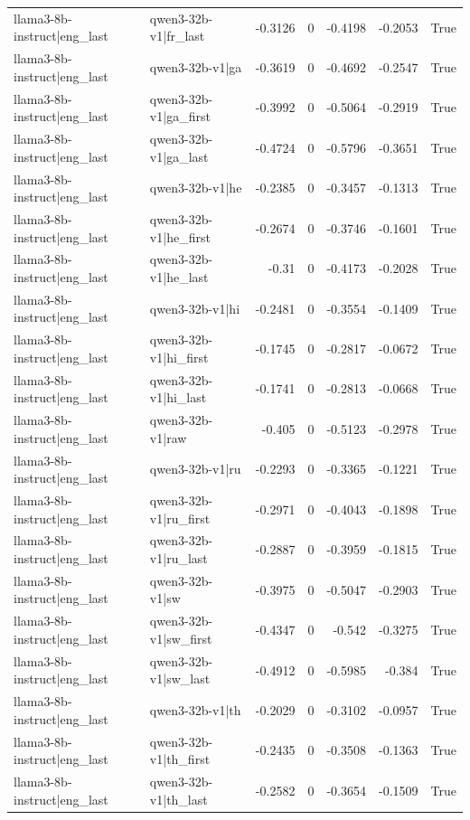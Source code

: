 \begin{table}
\begin{tabular}{l l r r r r l}
llama3-8b-instruct|eng_last & qwen3-32b-v1|fr_last & -0.3126 & 0 & -0.4198 & -0.2053 & True \\
llama3-8b-instruct|eng_last & qwen3-32b-v1|ga & -0.3619 & 0 & -0.4692 & -0.2547 & True \\
llama3-8b-instruct|eng_last & qwen3-32b-v1|ga_first & -0.3992 & 0 & -0.5064 & -0.2919 & True \\
llama3-8b-instruct|eng_last & qwen3-32b-v1|ga_last & -0.4724 & 0 & -0.5796 & -0.3651 & True \\
llama3-8b-instruct|eng_last & qwen3-32b-v1|he & -0.2385 & 0 & -0.3457 & -0.1313 & True \\
llama3-8b-instruct|eng_last & qwen3-32b-v1|he_first & -0.2674 & 0 & -0.3746 & -0.1601 & True \\
llama3-8b-instruct|eng_last & qwen3-32b-v1|he_last & -0.31 & 0 & -0.4173 & -0.2028 & True \\
llama3-8b-instruct|eng_last & qwen3-32b-v1|hi & -0.2481 & 0 & -0.3554 & -0.1409 & True \\
llama3-8b-instruct|eng_last & qwen3-32b-v1|hi_first & -0.1745 & 0 & -0.2817 & -0.0672 & True \\
llama3-8b-instruct|eng_last & qwen3-32b-v1|hi_last & -0.1741 & 0 & -0.2813 & -0.0668 & True \\
llama3-8b-instruct|eng_last & qwen3-32b-v1|raw & -0.405 & 0 & -0.5123 & -0.2978 & True \\
llama3-8b-instruct|eng_last & qwen3-32b-v1|ru & -0.2293 & 0 & -0.3365 & -0.1221 & True \\
llama3-8b-instruct|eng_last & qwen3-32b-v1|ru_first & -0.2971 & 0 & -0.4043 & -0.1898 & True \\
llama3-8b-instruct|eng_last & qwen3-32b-v1|ru_last & -0.2887 & 0 & -0.3959 & -0.1815 & True \\
llama3-8b-instruct|eng_last & qwen3-32b-v1|sw & -0.3975 & 0 & -0.5047 & -0.2903 & True \\
llama3-8b-instruct|eng_last & qwen3-32b-v1|sw_first & -0.4347 & 0 & -0.542 & -0.3275 & True \\
llama3-8b-instruct|eng_last & qwen3-32b-v1|sw_last & -0.4912 & 0 & -0.5985 & -0.384 & True \\
llama3-8b-instruct|eng_last & qwen3-32b-v1|th & -0.2029 & 0 & -0.3102 & -0.0957 & True \\
llama3-8b-instruct|eng_last & qwen3-32b-v1|th_first & -0.2435 & 0 & -0.3508 & -0.1363 & True \\
llama3-8b-instruct|eng_last & qwen3-32b-v1|th_last & -0.2582 & 0 & -0.3654 & -0.1509 & True \\

\end{tabular}
\end{table}

